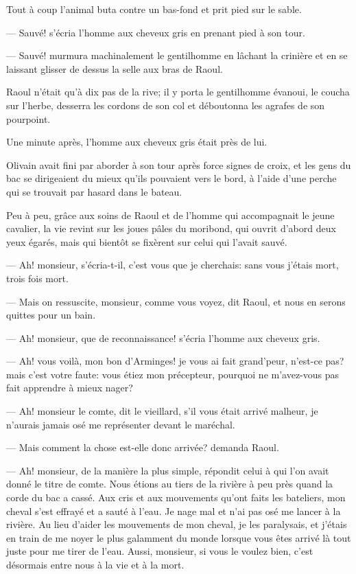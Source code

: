 Tout à coup l'animal buta contre un bas-fond et prit pied sur le sable.

— Sauvé! s'écria l'homme aux cheveux gris en prenant pied à son tour.

— Sauvé! murmura machinalement le gentilhomme en lâchant la crinière et en se laissant glisser de dessus la selle aux bras de Raoul.

Raoul n'était qu'à dix pas de la rive; il y porta le gentilhomme évanoui, le coucha sur l'herbe, desserra les cordons de son col et déboutonna les agrafes de son pourpoint.

Une minute après, l'homme aux cheveux gris était près de lui.

Olivain avait fini par aborder à son tour après force signes de croix, et les gens du bac se dirigeaient du mieux qu'ils pouvaient vers le bord, à l'aide d'une perche qui se trouvait par hasard dans le bateau.

Peu à peu, grâce aux soins de Raoul et de l'homme qui accompagnait le jeune cavalier, la vie revint sur les joues pâles du moribond, qui ouvrit d'abord deux yeux égarés, mais qui bientôt se fixèrent sur celui qui l'avait sauvé.

— Ah! monsieur, s'écria-t-il, c'est vous que je cherchais: sans vous j'étais mort, trois fois mort.

— Mais on ressuscite, monsieur, comme vous voyez, dit Raoul, et nous en serons quittes pour un bain.

— Ah! monsieur, que de reconnaissance! s'écria l'homme aux cheveux gris.

— Ah! vous voilà, mon bon d'Arminges! je vous ai fait grand'peur, n'est-ce pas? mais c'est votre faute: vous étiez mon précepteur, pourquoi ne m'avez-vous pas fait apprendre à mieux nager?

— Ah! monsieur le comte, dit le vieillard, s'il vous était arrivé malheur, je n'aurais jamais osé me représenter devant le maréchal.

— Mais comment la chose est-elle donc arrivée? demanda Raoul.

— Ah! monsieur, de la manière la plus simple, répondit celui à qui l'on avait donné le titre de comte. Nous étions au tiers de la rivière à peu près quand la corde du bac a cassé. Aux cris et aux mouvements qu'ont faits les bateliers, mon cheval s'est effrayé et a sauté à l'eau. Je nage mal et n'ai pas osé me lancer à la rivière. Au lieu d'aider les mouvements de mon cheval, je les paralysais, et j'étais en train de me noyer le plus galamment du monde lorsque vous êtes arrivé là tout juste pour me tirer de l'eau. Aussi, monsieur, si vous le voulez bien, c'est désormais entre nous à la vie et à la mort.


